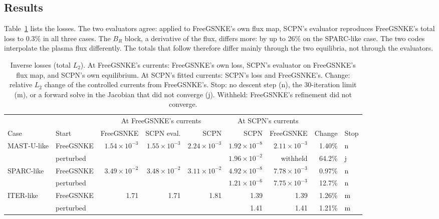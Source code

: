 \documentclass[11pt]{article}
\begin{document}
\subsection{Results}

Table~\ref{tab:inverse} lists the losses.  The two evaluators agree: applied to
FreeGSNKE's own flux map, SCPN's evaluator reproduces FreeGSNKE's total loss to
0.3\% in all three cases.  The $B_R$ block, a derivative of the flux, differs more: by up
to 26\% on the SPARC-like case.  The two codes interpolate the plasma flux
differently.  The totals that follow therefore differ mainly through the two
equilibria, not through the evaluators.

\begin{table}[ht]
\centering
\caption{Inverse losses (total $L_2$).  At FreeGSNKE's currents: FreeGSNKE's own
loss, SCPN's evaluator on FreeGSNKE's flux map, and SCPN's own equilibrium.  At
SCPN's fitted currents: SCPN's loss and FreeGSNKE's.  Change: relative $L_2$
change of the controlled currents from FreeGSNKE's.  Stop: no descent step (n),
the 30-iteration limit (m), or a forward solve in the Jacobian that did not
converge (j).  Withheld: FreeGSNKE's refinement did not converge.}
\label{tab:inverse}
\footnotesize
\setlength{\tabcolsep}{3pt}
\begin{tabular}{llrrrrrrl}
\toprule
 & & \multicolumn{3}{c}{At FreeGSNKE's currents} & \multicolumn{2}{c}{At SCPN's currents} & & \\
\cmidrule(lr){3-5}\cmidrule(lr){6-7}
Case & Start & FreeGSNKE & SCPN eval. & SCPN & SCPN & FreeGSNKE & Change & Stop \\
\midrule
MAST-U-like & FreeGSNKE & $1.54 \times 10^{-3}$ & $1.55 \times 10^{-3}$ & $2.24 \times 10^{-3}$ & $1.92 \times 10^{-8}$ & $2.11 \times 10^{-3}$ & 1.40\% & n \\
 & perturbed & & & & $1.96 \times 10^{-2}$ & withheld & 64.2\% & j \\
SPARC-like & FreeGSNKE & $3.49 \times 10^{-2}$ & $3.48 \times 10^{-2}$ & $3.11 \times 10^{-2}$ & $4.92 \times 10^{-8}$ & $7.78 \times 10^{-3}$ & 0.97\% & n \\
 & perturbed & & & & $1.21 \times 10^{-6}$ & $7.75 \times 10^{-3}$ & 12.7\% & n \\
ITER-like & FreeGSNKE & 1.71 & 1.71 & 1.81 & 1.39 & 1.39 & 1.26\% & m \\
 & perturbed & & & & 1.41 & 1.41 & 1.21\% & m \\
\bottomrule
\end{tabular}
\end{table}
\end{document}
